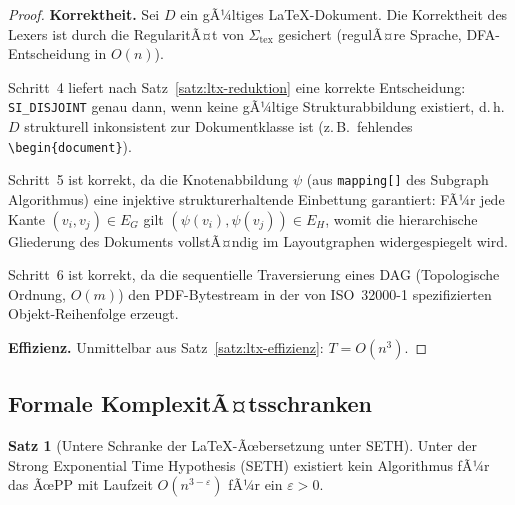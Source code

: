 ﻿\documentclass[a4paper,12pt]{article}
\theoremstyle{definition}
\newtheorem{satz}{Satz}
\begin{document}
\begin{proof}
	\textbf{Korrektheit.}
	Sei $D$ ein gÃ¼ltiges \LaTeX-Dokument. Die Korrektheit des Lexers ist
	durch die RegularitÃ¤t von $\Sigma_{\mathrm{tex}}$ gesichert
	(regulÃ¤re Sprache, DFA-Entscheidung in $O(n)$).
	
	Schritt~4 liefert nach Satz~\ref{satz:ltx-reduktion} eine korrekte
	Entscheidung: \texttt{SI\_DISJOINT} genau dann, wenn keine gÃ¼ltige
	Strukturabbildung existiert, d.\,h.\ $D$ strukturell inkonsistent
	zur Dokumentklasse ist (z.\,B.\ fehlendes \texttt{\textbackslash begin\{document\}}).
	
	Schritt~5 ist korrekt, da die Knotenabbildung $\psi$
	(aus \texttt{mapping[]} des Subgraph Algorithmus) eine injektive
	strukturerhaltende Einbettung garantiert: FÃ¼r jede Kante
	$(v_i, v_j) \in E_G$ gilt $(\psi(v_i), \psi(v_j)) \in E_H$, womit
	die hierarchische Gliederung des Dokuments vollstÃ¤ndig im Layoutgraphen
	widergespiegelt wird.
	
	Schritt~6 ist korrekt, da die sequentielle Traversierung eines DAG
	(Topologische Ordnung, $O(m)$) den PDF-Bytestream in der von
	ISO~32000-1 spezifizierten Objekt-Reihenfolge erzeugt.
	
	\medskip
	\textbf{Effizienz.} Unmittelbar aus Satz~\ref{satz:ltx-effizienz}:
	$T = O(n^3)$.
\end{proof}

\subsection{Formale KomplexitÃ¤tsschranken}
\label{sec:ltx-komplexitaet}

\begin{satz}[Untere Schranke der \LaTeX-Ãœbersetzung unter SETH]
	\label{satz:ltx-seth}
	Unter der Strong Exponential Time Hypothesis (SETH) existiert kein
	Algorithmus fÃ¼r das ÃœPP mit Laufzeit $O(n^{3 - \varepsilon})$ fÃ¼r
	ein $\varepsilon > 0$.
\end{satz}
\end{document}
